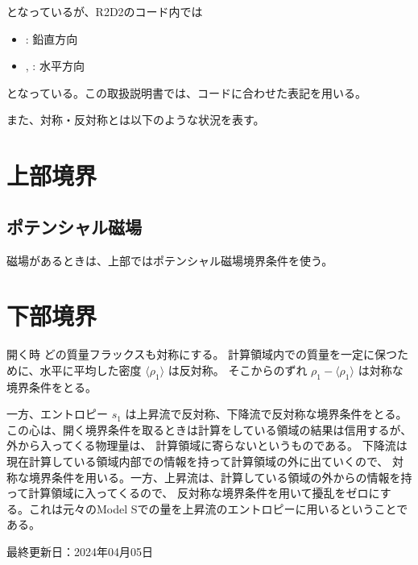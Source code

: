\documentclass[letterpaper,10pt,dvipdfmx,report]{sphinxmanual}
\let\sphinxpxdimen\pdfpxdimen\else\newdimen\sphinxpxdimen
\begin{document}
\sphinxAtStartPar
となっているが、R2D2のコード内では
\begin{itemize}
\item {} 
\sphinxAtStartPar
{}: 鉛直方向

\item {} 
\sphinxAtStartPar
{}, : 水平方向

\end{itemize}

\sphinxAtStartPar
となっている。この取扱説明書では、コードに合わせた表記を用いる。

\sphinxAtStartPar
また、対称・反対称とは以下のような状況を表す。

\noindent\sphinxincludegraphics[width=450\sphinxpxdimen]{{bc_sym}.png}


\section{上部境界}
\label{\detokenize{boundary:id2}}

\subsection{ポテンシャル磁場}
\label{\detokenize{boundary:id3}}
\sphinxAtStartPar
磁場があるときは、上部ではポテンシャル磁場境界条件を使う。


\section{下部境界}
\label{\detokenize{boundary:id4}}
\sphinxAtStartPar
開く時
どの質量フラックスも対称にする。 計算領域内での質量を一定に保つために、水平に平均した密度
\(\langle \rho_1\rangle\) は反対称。 そこからのずれ
\(\rho_1 - \langle \rho_1 \rangle\) は対称な境界条件をとる。

\sphinxAtStartPar
一方、エントロピー \(s_1\) は上昇流で反対称、下降流で反対称な境界条件をとる。
この心は、開く境界条件を取るときは計算をしている領域の結果は信用するが、外から入ってくる物理量は、
計算領域に寄らないというものである。 下降流は現在計算している領域内部での情報を持って計算領域の外に出ていくので、
対称な境界条件を用いる。一方、上昇流は、計算している領域の外からの情報を持って計算領域に入ってくるので、
反対称な境界条件を用いて擾乱をゼロにする。これは元々のModel Sでの量を上昇流のエントロピーに用いるということである。

\sphinxAtStartPar
最終更新日：2024年04月05日
\end{document}
